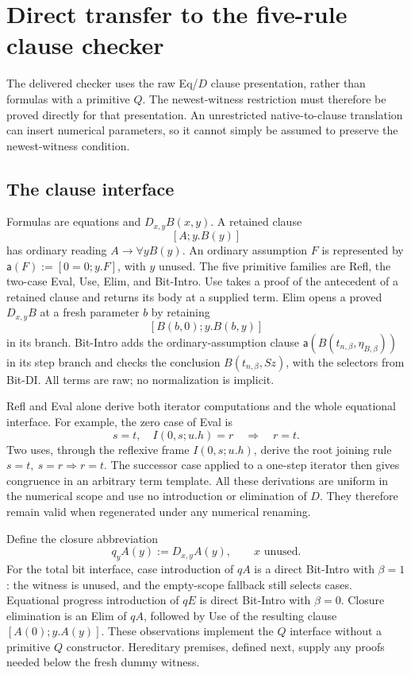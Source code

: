 \section{Direct transfer to the five-rule clause checker}
\label{sec:clausal-transfer}

The delivered checker uses the raw Eq/$D$ clause presentation, rather
than formulas with a primitive $Q$.  The newest-witness restriction must
therefore be proved directly for that presentation.  An unrestricted
native-to-clause translation can insert numerical parameters, so it
cannot simply be assumed to preserve the newest-witness condition.

\subsection{The clause interface}

Formulas are equations and $D_{x,y}B(x,y)$.  A retained clause
\[
 [A;y.B(y)]
\]
has ordinary reading $A\to\forall y B(y)$.  An ordinary assumption
$F$ is represented by $\mathsf a(F):=[0=0;y.F]$, with $y$ unused.
The five primitive families are Refl, the two-case Eval, Use, Elim,
and Bit-Intro.  Use takes a proof of the antecedent of a retained
clause and returns its body at a supplied term.  Elim opens a proved
$D_{x,y}B$ at a fresh parameter $b$ by retaining
\[
 [B(b,0);y.B(b,y)]
\]
in its branch.  Bit-Intro adds the ordinary-assumption clause
$\mathsf a(B(t_{n,\beta},\eta_{B,\beta}))$ in its step branch and
checks the conclusion $B(t_{n,\beta},Sz)$, with the selectors from
Bit-DI.  All terms are raw; no normalization is implicit.

Refl and Eval alone derive both iterator computations and the whole
equational interface.  For example, the zero case of Eval is
\[
 s=t,\quad I(0,s;u.h)=r\quad\Longrightarrow\quad r=t.
\]
Two uses, through the reflexive frame $I(0,s;u.h)$, derive the root
joining rule $s=t,\ s=r\Longrightarrow r=t$.  The successor case
applied to a one-step iterator then gives congruence in an arbitrary
term template.  All these derivations are uniform in the numerical
scope and use no introduction or elimination of $D$.  They therefore
remain valid when regenerated under any numerical renaming.

Define the closure abbreviation
\[
 q_yA(y):=D_{x,y}A(y),\qquad x\text{ unused}.
\]
For the total bit interface, case introduction of $qA$ is a direct
Bit-Intro with $\beta=1$: the witness is unused, and the empty-scope
fallback still selects cases.  Equational progress introduction of
$qE$ is direct Bit-Intro with $\beta=0$.  Closure elimination is an
Elim of $qA$, followed by Use of the resulting clause
$[A(0);y.A(y)]$.  These observations implement the $Q$ interface
without a primitive $Q$ constructor.  Hereditary premises, defined
next, supply any proofs needed below the fresh dummy witness.


